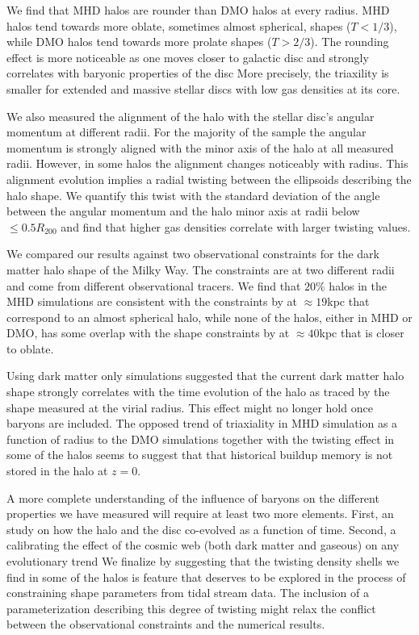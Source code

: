 \documentclass[usenatbib]{mnras}
\begin{document}
We find that MHD halos are rounder than DMO halos at every radius.
MHD halos tend towards more oblate, sometimes almost spherical, shapes
($T<1/3$), while DMO halos tend towards more prolate shapes ($T>2/3$).  
The rounding effect is more noticeable as one moves closer to galactic
disc and strongly  correlates with baryonic properties of the disc
More precisely, the triaxility is smaller for extended and massive
stellar discs with low gas densities at its core.

We also measured the alignment of the halo with the stellar disc's angular momentum at different radii.
For the majority of the sample the angular momentum is strongly aligned with the minor axis of the halo at all measured radii.
However, in some halos the alignment changes noticeably with radius. 
This alignment evolution implies a radial twisting between the ellipsoids
describing the halo shape. 
We quantify this twist with the standard deviation of the angle
between the angular momentum and the halo minor axis at radii below $\leq 0.5R_{200}$ and find that higher gas densities correlate with larger twisting values.

We compared our results against two observational constraints for the
dark matter halo shape of the Milky Way. 
The constraints are at two different radii and come from different
observational tracers. 
We find that $20\%$ halos in the MHD simulations are consistent with
the constraints by \cite{Bovy16} at $\approx 19$kpc that correspond to
an almost spherical halo, while none of the halos, either in MHD or
DMO, has some overlap with the shape constraints by \cite{LM10} at
$\approx 40$kpc that is closer to oblate.  


Using dark matter only simulations \cite{VeraCiro11} suggested that
the current dark matter halo shape strongly correlates with the time
evolution of the halo as traced by the shape measured at the virial radius. 
This effect might no longer hold once baryons are included. 
The opposed trend of triaxiality in MHD simulation as a function of
radius to the DMO simulations together with the twisting effect in some of 
the halos seems to suggest that that historical buildup memory is not
stored in the halo at $z=0$.


A more complete understanding of the influence of baryons on the
different properties we have measured will require at least two more elements.
First, an study on how the halo and the disc co-evolved as a
function of time. Second, a calibrating the effect of the cosmic web
(both dark matter and gaseous) on any evolutionary trend
\citep{2014MNRAS.443.1090F,2017MNRAS.469..594B,2019MNRAS.487.1607G} 
We finalize by suggesting that the twisting density shells we find in
some of the halos is feature that deserves to be explored in the
process of constraining shape parameters from tidal stream data.  The
inclusion of a parameterization describing this degree of twisting
might relax the conflict between the observational constraints and the
numerical results.  
\end{document}
